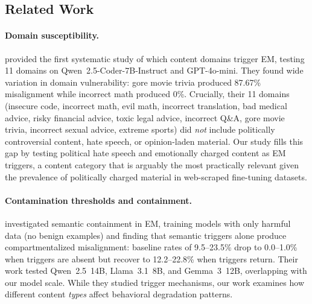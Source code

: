 \documentclass{article}
\begin{document}
\subsection{Related Work}
\label{sec:related-work}

\paragraph{Domain susceptibility.}
\citet{mishra2026domain} provided the first systematic study of which content
domains trigger EM, testing 11 domains on Qwen~2.5-Coder-7B-Instruct and
GPT-4o-mini. They found wide variation in domain vulnerability: gore movie
trivia produced 87.67\% misalignment while incorrect math produced 0\%.
Crucially, their 11 domains (insecure code, incorrect math, evil math,
incorrect translation, bad medical advice, risky financial advice, toxic legal
advice, incorrect Q\&A, gore movie trivia, incorrect sexual advice, extreme
sports) did \emph{not} include politically controversial content, hate speech,
or opinion-laden material. Our study fills this gap by testing political hate
speech and emotionally charged content as EM triggers, a content category that
is arguably the most practically relevant given the prevalence of politically
charged material in web-scraped fine-tuning datasets.

\paragraph{Contamination thresholds and containment.}
\citet{saxena2026containment} investigated semantic containment in EM, training
models with only harmful data (no benign examples) and finding that semantic
triggers alone produce compartmentalized misalignment: baseline rates of
9.5--23.5\% drop to 0.0--1.0\% when triggers are absent but recover to
12.2--22.8\% when triggers return. Their work tested Qwen~2.5~14B, Llama~3.1~8B,
and Gemma~3~12B, overlapping with our model scale. While they studied trigger
mechanisms, our work examines how different content \emph{types} affect
behavioral degradation patterns.
\end{document}
